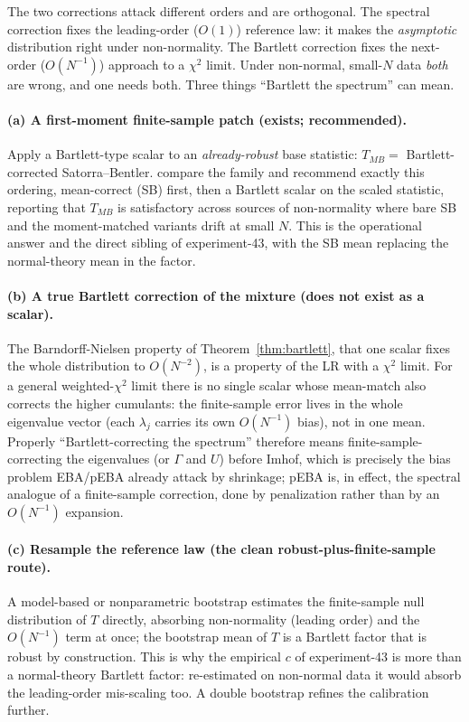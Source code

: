 \documentclass[11pt]{article}
\theoremstyle{plain}
\theoremstyle{remark}
\begin{document}
The two corrections attack different orders and are orthogonal. The spectral
correction fixes the leading-order ($O(1)$) reference law: it makes the
\emph{asymptotic} distribution right under non-normality. The Bartlett correction
fixes the next-order ($O(N^{-1})$) approach to a $\chi^2$ limit. Under non-normal,
small-$N$ data \emph{both} are wrong, and one needs both. Three things
``Bartlett the spectrum'' can mean.

\paragraph{(a) A first-moment finite-sample patch (exists; recommended).}
Apply a Bartlett-type scalar to an \emph{already-robust} base statistic:
$T_{MB} = $ Bartlett-corrected Satorra--Bentler. \cite{jobstauerswaldmoshagen2022}
compare the family and recommend exactly this ordering, mean-correct (SB) first,
then a Bartlett scalar on the scaled statistic, reporting that $T_{MB}$ is
satisfactory across sources of non-normality where bare SB and the moment-matched
variants drift at small $N$. This is the operational answer and the direct sibling
of experiment-43, with the SB mean replacing the normal-theory mean in the factor.

\paragraph{(b) A true Bartlett correction of the mixture (does not exist as a
scalar).} The Barndorff-Nielsen property of Theorem~\ref{thm:bartlett}, that one
scalar fixes the whole distribution to $O(N^{-2})$, is a property of the LR with a
$\chi^2$ limit. For a general weighted-$\chi^2$ limit there is no single scalar
whose mean-match also corrects the higher cumulants: the finite-sample error lives
in the whole eigenvalue vector (each $\lambda_j$ carries its own $O(N^{-1})$ bias),
not in one mean. Properly ``Bartlett-correcting the spectrum'' therefore means
finite-sample-correcting the eigenvalues (or $\Gamma$ and $U$) before Imhof, which
is precisely the bias problem EBA/pEBA already attack by shrinkage; pEBA is, in
effect, the spectral analogue of a finite-sample correction, done by penalization
rather than by an $O(N^{-1})$ expansion.

\paragraph{(c) Resample the reference law (the clean robust-plus-finite-sample
route).} A model-based or nonparametric bootstrap \cite{bollenstine1992} estimates
the finite-sample null distribution of $T$ directly, absorbing non-normality
(leading order) and the $O(N^{-1})$ term at once; the bootstrap mean of $T$ is a
Bartlett factor that is robust by construction. This is why the empirical $c$ of
experiment-43 is more than a normal-theory Bartlett factor: re-estimated on
non-normal data it would absorb the leading-order mis-scaling too. A double
bootstrap refines the calibration further.
\end{document}
